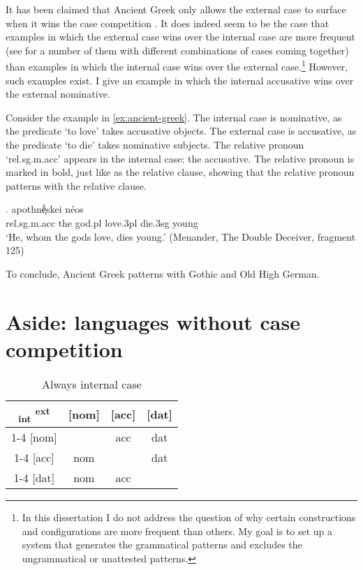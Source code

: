 It has been claimed that Ancient Greek only allows the external case to surface when it wins the case competition  \citep[cf.][]{cinqueforthcoming}. It does indeed seem to be the case that examples in which the external case wins over the internal case are more frequent (see \citealt{kakarikos2014} for a number of them with different combinations of cases coming together) than examples in which the internal case wins over the external case.\footnote{
In this dissertation I do not address the question of why certain constructions and configurations are more frequent than others. My goal is to set up a system that generates the grammatical patterns and excludes the ungrammatical or unattested patterns.
}
However, such examples exist. I give an example in which the internal accusative wins over the external nominative.

Consider the example in \ref{ex:ancient-greek}.
The internal case is nominative, as the predicate  `to love' takes accusative objects.
The external case is accusative, as the predicate  `to die' takes nominative subjects.
The relative pronoun  `\ac{rel}.\ac{sg}.\ac{m}.\ac{acc}' appears in the internal case: the accusative. The relative pronoun is marked in bold, just like as the relative clause, showing that the relative pronoun patterns with the relative clause.

\exg.     apothnḗͅskei néos\\
\ac{rel}.\ac{sg}.\ac{m}.\ac{acc} the god.\ac{pl} love.3\ac{pl} die.3\ac{sg} young\\
`He, whom the gods love, dies young.' (Menander, The Double Deceiver, fragment 125)\label{ex:ancient-greek}

To conclude, Ancient Greek patterns with Gothic and Old High German.



\section{Aside: languages without case competition}\label{sec:potentiel-counterexamples}

\begin{table}[ht]
  \center
  \caption{Always internal case}
  \begin{tabular}{c|c|c|c}
    \toprule
   \textsubscript{\ac{int}} \textsuperscript{\ac{ext}}
          & [\ac{nom}]
          & [\ac{acc}]
          & [\ac{dat}]
          \\ \cmidrule{1-4}
      [\ac{nom}]
          &
          & \ac{acc}
          & \ac{dat}
          \\ \cmidrule{1-4}
      [\ac{acc}]
          & \ac{nom}
          &
          & \ac{dat}
          \\ \cmidrule{1-4}
      [\ac{dat}]
          & \ac{nom}
          & \ac{acc}
          &
          \\
    \bottomrule
  \end{tabular}
  \label{tbl:no-case-competition-int}
\end{table}

